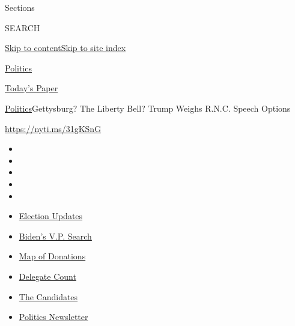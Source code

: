 Sections

SEARCH

\protect\hyperlink{site-content}{Skip to
content}\protect\hyperlink{site-index}{Skip to site index}

\href{https://www.nytimes.com/section/politics}{Politics}

\href{https://myaccount.nytimes.com/auth/login?response_type=cookie\&client_id=vi}{}

\href{https://www.nytimes.com/section/todayspaper}{Today's Paper}

\href{/section/politics}{Politics}\textbar{}Gettysburg? The Liberty
Bell? Trump Weighs R.N.C. Speech Options

\url{https://nyti.ms/31gKSnG}

\begin{itemize}
\item
\item
\item
\item
\item
\end{itemize}

\begin{itemize}
\item
  \href{https://www.nytimes.com/2020/08/03/us/elections/biden-vs-trump.html?action=click\&pgtype=Article\&state=default\&region=TOP_BANNER\&context=storylines_menu}{Election
  Updates}
\item
  \href{https://www.nytimes.com/article/biden-vice-president-2020.html?action=click\&pgtype=Article\&state=default\&region=TOP_BANNER\&context=storylines_menu}{Biden's
  V.P. Search}
\item
  \href{https://www.nytimes.com/interactive/2020/07/24/us/politics/trump-biden-campaign-donors.html?action=click\&pgtype=Article\&state=default\&region=TOP_BANNER\&context=storylines_menu}{Map
  of Donations}
\item
  \href{https://www.nytimes.com/interactive/2020/us/elections/delegate-count-primary-results.html?action=click\&pgtype=Article\&state=default\&region=TOP_BANNER\&context=storylines_menu}{Delegate
  Count}
\item
  \href{https://www.nytimes.com/interactive/2019/us/politics/2020-presidential-candidates.html?action=click\&pgtype=Article\&state=default\&region=TOP_BANNER\&context=storylines_menu}{The
  Candidates}
\item
  \href{https://www.nytimes.com/newsletters/politics?action=click\&pgtype=Article\&state=default\&region=TOP_BANNER\&context=storylines_menu}{Politics
  Newsletter}
\end{itemize}

